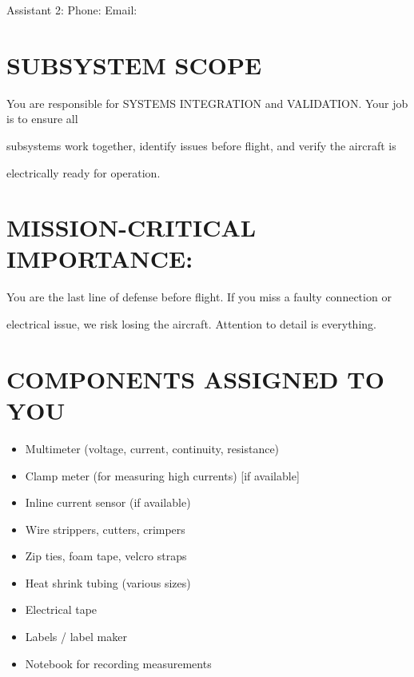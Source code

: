 \documentclass[11pt,letterpaper]{article}
\begin{document}
Assistant 2:   \underline{\hspace{4.8cm}}  Phone: \underline{\hspace{1.7999999999999998cm}}  Email: \underline{\hspace{1.95cm}}\par

\section{SUBSYSTEM SCOPE}

You are responsible for SYSTEMS INTEGRATION and VALIDATION. Your job is to ensure all\par

subsystems work together, identify issues before flight, and verify the aircraft is\par

electrically ready for operation.\par

\section{MISSION-CRITICAL IMPORTANCE:}

You are the last line of defense before flight. If you miss a faulty connection or\par

electrical issue, we risk losing the aircraft. Attention to detail is everything.\par

\section{COMPONENTS ASSIGNED TO YOU}

\begin{itemize}
  \item Multimeter (voltage, current, continuity, resistance)
  \item Clamp meter (for measuring high currents) [if available]
  \item Inline current sensor (if available)
  \item Wire strippers, cutters, crimpers
  \item Zip ties, foam tape, velcro straps
  \item Heat shrink tubing (various sizes)
  \item Electrical tape
  \item Labels / label maker
  \item Notebook for recording measurements
\end{itemize}
\end{document}
